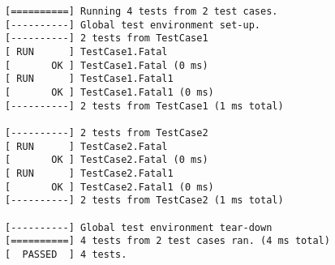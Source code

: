 \documentclass[12pt,a4paper,notitlepage]{report}
\begin{document}
		\begin{lstlisting}[label=some-code,caption=Przykłądowy pozytywny wynik testu w bibliotece Google test]
[==========] Running 4 tests from 2 test cases.
[----------] Global test environment set-up.
[----------] 2 tests from TestCase1
[ RUN      ] TestCase1.Fatal
[       OK ] TestCase1.Fatal (0 ms)
[ RUN      ] TestCase1.Fatal1
[       OK ] TestCase1.Fatal1 (0 ms)
[----------] 2 tests from TestCase1 (1 ms total)

[----------] 2 tests from TestCase2
[ RUN      ] TestCase2.Fatal
[       OK ] TestCase2.Fatal (0 ms)
[ RUN      ] TestCase2.Fatal1
[       OK ] TestCase2.Fatal1 (0 ms)
[----------] 2 tests from TestCase2 (1 ms total)

[----------] Global test environment tear-down
[==========] 4 tests from 2 test cases ran. (4 ms total)
[  PASSED  ] 4 tests.
		\end{lstlisting}
\end{document}
